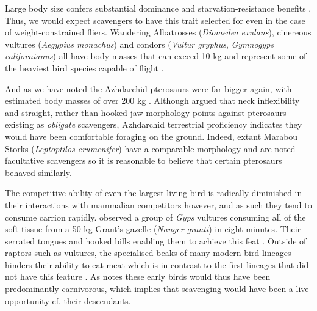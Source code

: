 \documentclass[a4paper,12pt]{article}
\begin{document}
Large body size confers substantial dominance and starvation-resistance benefits \citep{ruxton2004obligate}.
Thus, we would expect scavengers to have this trait selected for even in the case of weight-constrained fliers.
Wandering Albatrosses (\textit{Diomedea exulans}), cinereous vultures (\textit{Aegypius monachus}) and condors (\textit{Vultur gryphus}, \textit{Gymnogyps californianus}) all have body masses that can exceed 10 kg and represent some of the heaviest bird species capable of flight \citep{weimerskirch1992reproductive,ferguson2001raptors,donazar2002effects}.

And as we have noted the Azhdarchid pterosaurs were far bigger again, with estimated body masses of over 200 kg \citep{witton2010size}.
Although \cite{witton2008reappraisal} argued that neck inflexibility and straight, rather than hooked jaw morphology points against pterosaurs existing as \textit{obligate} scavengers, Azhdarchid terrestrial proficiency indicates they would have been comfortable foraging on the ground.
Indeed, extant Marabou Storks (\textit{Leptoptilos crumenifer}) have a comparable morphology and are noted facultative scavengers \citep{monadjem2012survival} so it is reasonable to believe that certain pterosaurs behaved similarly.

The competitive ability of even the largest living bird is radically diminished in their interactions with mammalian competitors however, and as such they tend to consume carrion rapidly. %
\cite{houston1974role} observed a group of \textit{Gyps} vultures consuming all of the soft tissue from a 50 kg Grant’s gazelle (\textit{Nanger granti}) in eight minutes. 
Their serrated tongues and hooked bills enabling them to achieve this feat \citep{houston1975digestive}. 
Outside of raptors such as vultures, the specialised beaks of many modern bird lineages hinders their ability to eat meat which is in contrast to the first lineages that did not have this feature \citep{martyniuk2012field} . 
As \cite{martyniuk2012field} notes these early birds would thus have been predominantly carnivorous, which implies that scavenging would have been a live opportunity cf. their descendants. 
\end{document}
